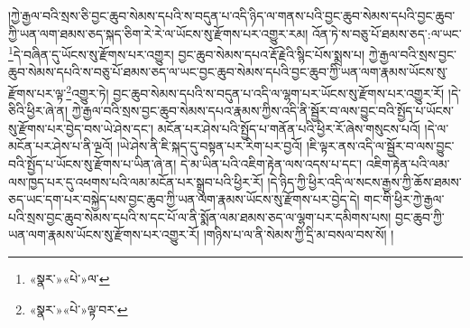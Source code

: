 །ཀྱེ་རྒྱལ་བའི་སྲས་ཅི་བྱང་ཆུབ་སེམས་དཔའི་ས་བདུན་པ་འདི་ཉིད་ལ་གནས་པའི་བྱང་ཆུབ་སེམས་དཔའི་བྱང་ཆུབ་ཀྱི་ཡན་ལག་ཐམས་ཅད་སྐད་ཅིག་རེ་རེ་ལ་ཡོངས་སུ་རྫོགས་པར་འགྱུར་རམ། འོན་ཏེ་ས་བཅུ་པོ་ཐམས་ཅད་:ལ་ཡང་\footnote{«སྣར་»«པེ་»ལ་}དེ་བཞིན་དུ་ཡོངས་སུ་རྫོགས་པར་འགྱུར། བྱང་ཆུབ་སེམས་དཔའ་རྡོ་རྗེའི་སྙིང་པོས་སྨྲས་པ། ཀྱེ་རྒྱལ་བའི་སྲས་བྱང་ཆུབ་སེམས་དཔའི་ས་བཅུ་པོ་ཐམས་ཅད་ལ་ཡང་བྱང་ཆུབ་སེམས་དཔའི་བྱང་ཆུབ་ཀྱི་ཡན་ལག་རྣམས་ཡོངས་སུ་རྫོགས་པར་ལྟ་\footnote{«སྣར་»«པེ་»ལྟ་བར་}འགྱུར་ཏེ། བྱང་ཆུབ་སེམས་དཔའི་ས་བདུན་པ་འདི་ལ་ལྷག་པར་ཡོངས་སུ་རྫོགས་པར་འགྱུར་རོ། །དེ་ཅིའི་ཕྱིར་ཞེ་ན། ཀྱེ་རྒྱལ་བའི་སྲས་བྱང་ཆུབ་སེམས་དཔའ་རྣམས་ཀྱིས་འདི་ནི་སྦྱོར་བ་ལས་བྱུང་བའི་སྤྱོད་པ་ཡོངས་སུ་རྫོགས་པར་བྱེད་བས་ཡེ་ཤེས་དང་། མངོན་པར་ཤེས་པའི་སྤྱོད་པ་གནོན་པའི་ཕྱིར་རོ་ཞེས་གསུངས་པའོ། །དེ་ལ་མངོན་པར་ཤེས་པ་ནི་ལྔའོ། །ཡེ་ཤེས་ནི་ཇི་སྐད་དུ་བསྟན་པར་རིག་པར་བྱའོ། །ཇི་ལྟར་ནས་འདི་ལ་སྦྱོར་བ་ལས་བྱུང་བའི་སྤྱོད་པ་ཡོངས་སུ་རྫོགས་པ་ཡིན་ཞེ་ན། དེ་མ་ཡིན་པའི་འཇིག་རྟེན་ལས་འདས་པ་དང་། འཇིག་རྟེན་པའི་ལམ་ལས་ཁྱད་པར་དུ་འཕགས་པའི་ལམ་མངོན་པར་སྒྲུབ་པའི་ཕྱིར་རོ། །དེ་ཉིད་ཀྱི་ཕྱིར་འདི་ལ་སངས་རྒྱས་ཀྱི་ཆོས་ཐམས་ཅད་ཡང་དག་པར་བསྐྱེད་པས་བྱང་ཆུབ་ཀྱི་ཡན་ལག་རྣམས་ཡོངས་སུ་རྫོགས་པར་བྱེད་དེ། གང་གི་ཕྱིར་ཀྱེ་རྒྱལ་པའི་སྲས་བྱང་ཆུབ་སེམས་དཔའི་ས་དང་པོ་ལ་ནི་སྨོན་ལམ་ཐམས་ཅད་ལ་ལྷག་པར་དམིགས་པས། བྱང་ཆུབ་ཀྱི་ཡན་ལག་རྣམས་ཡོངས་སུ་རྫོགས་པར་འགྱུར་རོ། །གཉིས་པ་ལ་ནི་སེམས་ཀྱི་དྲི་མ་བསལ་བས་སོ། །
